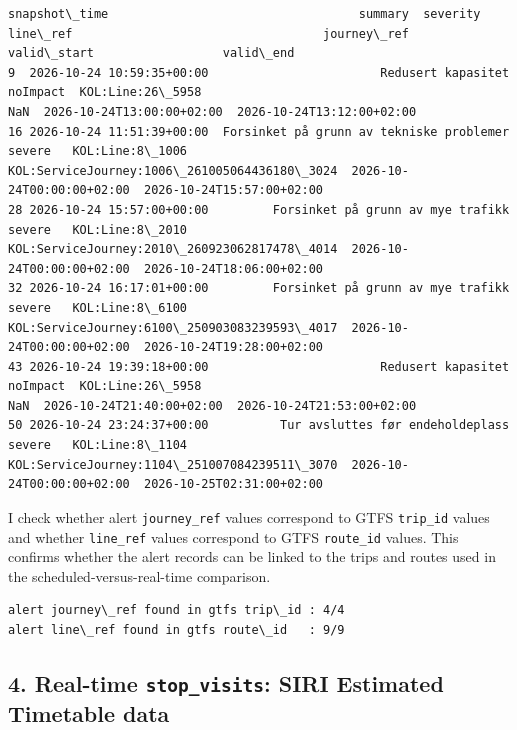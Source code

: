 \documentclass[11pt]{article}
\begin{document}
    
    \begin{Verbatim}[commandchars=\\\{\}]
               snapshot\_time                                   summary  severity          line\_ref                                   journey\_ref                valid\_start                  valid\_end
9  2026-10-24 10:59:35+00:00                        Redusert kapasitet  noImpact  KOL:Line:26\_5958                                           NaN  2026-10-24T13:00:00+02:00  2026-10-24T13:12:00+02:00
16 2026-10-24 11:51:39+00:00  Forsinket på grunn av tekniske problemer    severe   KOL:Line:8\_1006  KOL:ServiceJourney:1006\_261005064436180\_3024  2026-10-24T00:00:00+02:00  2026-10-24T15:57:00+02:00
28 2026-10-24 15:57:00+00:00         Forsinket på grunn av mye trafikk    severe   KOL:Line:8\_2010  KOL:ServiceJourney:2010\_260923062817478\_4014  2026-10-24T00:00:00+02:00  2026-10-24T18:06:00+02:00
32 2026-10-24 16:17:01+00:00         Forsinket på grunn av mye trafikk    severe   KOL:Line:8\_6100  KOL:ServiceJourney:6100\_250903083239593\_4017  2026-10-24T00:00:00+02:00  2026-10-24T19:28:00+02:00
43 2026-10-24 19:39:18+00:00                        Redusert kapasitet  noImpact  KOL:Line:26\_5958                                           NaN  2026-10-24T21:40:00+02:00  2026-10-24T21:53:00+02:00
50 2026-10-24 23:24:37+00:00          Tur avsluttes før endeholdeplass    severe   KOL:Line:8\_1104  KOL:ServiceJourney:1104\_251007084239511\_3070  2026-10-24T00:00:00+02:00  2026-10-25T02:31:00+02:00
    \end{Verbatim}

    
    I check whether alert \texttt{journey\_ref} values correspond to GTFS
\texttt{trip\_id} values and whether \texttt{line\_ref} values
correspond to GTFS \texttt{route\_id} values. This confirms whether the
alert records can be linked to the trips and routes used in the
scheduled-versus-real-time comparison.

    \begin{Verbatim}[commandchars=\\\{\}]
alert journey\_ref found in gtfs trip\_id : 4/4
alert line\_ref found in gtfs route\_id   : 9/9
    \end{Verbatim}

    \subsection{\texorpdfstring{4. Real-time \texttt{stop\_visits}: SIRI
Estimated Timetable
data}{4. Real-time stop\_visits: SIRI Estimated Timetable data}}\label{real-time-stop_visits-siri-estimated-timetable-data}
\end{document}
